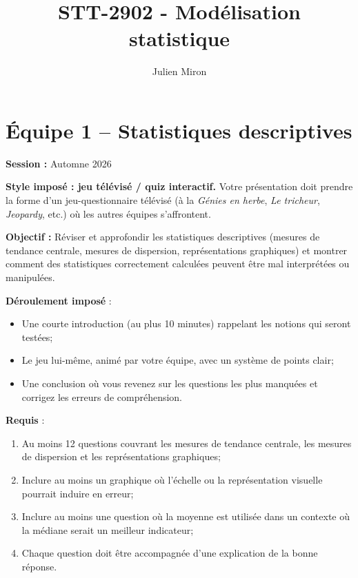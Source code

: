 \documentclass{article}
\title{STT-2902 - Modélisation statistique}
\author{Julien Miron}
\begin{document}
\section*{Équipe 1 – Statistiques descriptives}

\textbf{Session :} Automne 2026

\textbf{Style imposé : jeu télévisé / quiz interactif.} Votre présentation doit prendre la forme d'un jeu-questionnaire télévisé (à la \textit{Génies en herbe}, \textit{Le tricheur}, \textit{Jeopardy}, etc.) où les autres équipes s'affrontent.

\vspace{0.5cm}
\textbf{Objectif :} Réviser et approfondir les statistiques descriptives (mesures de tendance centrale, mesures de dispersion, représentations graphiques) et montrer comment des statistiques correctement calculées peuvent être mal interprétées ou manipulées.

\vspace{0.5cm}
\textbf{Déroulement imposé} :
\begin{itemize}
    \item Une courte introduction (au plus 10 minutes) rappelant les notions qui seront testées;
    \item Le jeu lui-même, animé par votre équipe, avec un système de points clair;
    \item Une conclusion où vous revenez sur les questions les plus manquées et corrigez les erreurs de compréhension.
\end{itemize}

\vspace{0.5cm}
\textbf{Requis} :
\begin{enumerate}
    \item Au moins 12 questions couvrant les mesures de tendance centrale, les mesures de dispersion et les représentations graphiques;
    \item Inclure au moins un graphique où l'échelle ou la représentation visuelle pourrait induire en erreur;
    \item Inclure au moins une question où la moyenne est utilisée dans un contexte où la médiane serait un meilleur indicateur;
    \item Chaque question doit être accompagnée d'une explication de la bonne réponse.
\end{enumerate}
\end{document}
